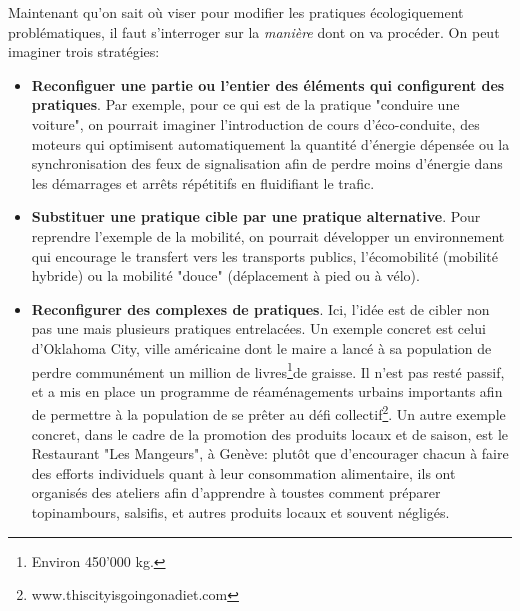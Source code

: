 \documentclass{article}
\begin{document}
 Maintenant qu'on sait où viser pour modifier les pratiques écologiquement problématiques, il faut s'interroger sur la \emph{manière} dont on va procéder. On peut imaginer trois stratégies:
 \begin{itemize}
 	\item \textbf{Reconfiguer une partie ou l'entier des éléments qui configurent des pratiques}. Par exemple, pour ce qui est de la pratique "conduire une voiture", on pourrait imaginer l'introduction de cours d'éco-conduite, des moteurs qui optimisent automatiquement la quantité d'énergie dépensée ou la synchronisation des feux de signalisation afin de perdre moins d'énergie dans les démarrages et arrêts répétitifs en fluidifiant le trafic.
 	\item \textbf{Substituer une pratique cible par une pratique alternative}. Pour reprendre l'exemple de la mobilité, on pourrait développer un environnement qui encourage le transfert vers les transports publics, l'écomobilité (mobilité hybride) ou la mobilité "douce" (déplacement à pied ou à vélo).
 	\item \textbf{Reconfigurer des complexes de pratiques}. Ici, l'idée est de cibler non pas une mais plusieurs pratiques entrelacées. Un exemple concret est celui d'Oklahoma City, ville américaine dont le maire a lancé à sa population de perdre  communément un million de livres\footnote{Environ 450'000 kg.}de graisse. Il n'est pas resté passif, et a mis en place un programme de réaménagements urbains importants afin de permettre à la population de se prêter au défi collectif\footnote{www.thiscityisgoingonadiet.com}. Un autre exemple concret, dans le cadre de la promotion des produits locaux et de saison, est le Restaurant "Les Mangeurs", à Genève: plutôt que d'encourager chacun à faire des efforts individuels quant à leur consommation alimentaire, ils ont organisés des ateliers afin d'apprendre à toustes comment préparer topinambours, salsifis, et autres produits locaux et souvent négligés.
 \end{itemize}

\end{document}
